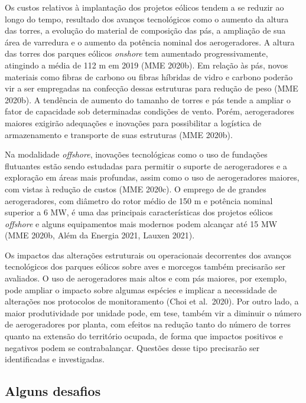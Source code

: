 \documentclass[
  oneside]{scrbook}
\begin{document}
Os custos relativos à implantação dos projetos eólicos tendem a se reduzir ao longo do tempo, resultado dos avanços tecnológicos como o aumento da altura das torres, a evolução do material de composição das pás, a ampliação de sua área de varredura e o aumento da potência nominal dos aerogeradores. A altura das torres dos parques eólicos \emph{onshore} tem aumentado progressivamente, atingindo a média de 112 m em 2019 (MME 2020b). Em relação às pás, novos materiais como fibras de carbono ou fibras híbridas de vidro e carbono poderão vir a ser empregadas na confecção dessas estruturas para redução de peso (MME 2020b). A tendência de aumento do tamanho de torres e pás tende a ampliar o fator de capacidade sob determinadas condições de vento. Porém, aerogeradores maiores exigirão adequações e inovações para possibilitar a logística de armazenamento e transporte de suas estruturas (MME 2020b).

Na modalidade \emph{offshore}, inovações tecnológicas como o uso de fundações flutuantes estão sendo estudadas para permitir o suporte de aerogeradores e a exploração em áreas mais profundas, assim como o uso de aerogeradores maiores, com vistas à redução de custos (MME 2020c). O emprego de de grandes aerogeradores, com diâmetro do rotor médio de 150 m e potência nominal superior a 6 MW, é uma das principais características dos projetos eólicos \emph{offshore} e alguns equipamentos mais modernos podem alcançar até 15 MW (MME 2020b, Além da Energia 2021, Lauxen 2021).

Os impactos das alterações estruturais ou operacionais decorrentes dos avanços tecnológicos dos parques eólicos sobre aves e morcegos também precisarão ser avaliados. O uso de aerogeradores mais altos e com pás maiores, por exemplo, pode ampliar o impacto sobre algumas espécies e implicar a necessidade de alterações nos protocolos de monitoramento (Choi et al.~2020). Por outro lado, a maior produtividade por unidade pode, em tese, também vir a diminuir o número de aerogeradores por planta, com efeitos na redução tanto do número de torres quanto na extensão do território ocupada, de forma que impactos positivos e negativos podem se contrabalançar. Questões desse tipo precisarão ser identificadas e investigadas.

\hypertarget{alguns-desafios}{%
\subsection{Alguns desafios}\label{alguns-desafios}}
\end{document}
